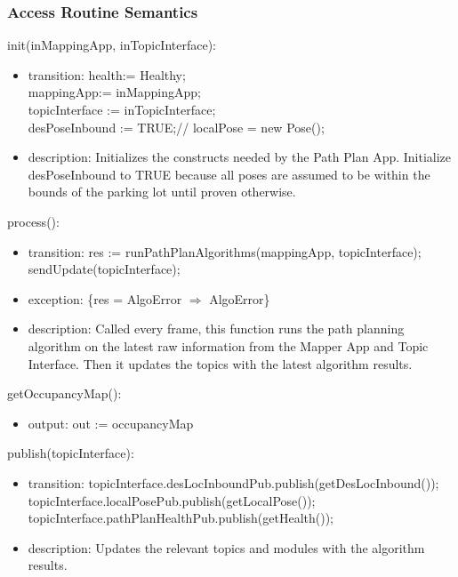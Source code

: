 \documentclass[12pt, titlepage]{article}
\begin{document}
\subsubsection{Access Routine Semantics}
\noindent init(inMappingApp, inTopicInterface):
\begin{itemize}
\item transition: health:= Healthy; \\ mappingApp:= inMappingApp; \\ topicInterface := inTopicInterface; \\ desPoseInbound := TRUE;//
localPose = new Pose(); 
\item description: Initializes the constructs needed by the Path Plan App. Initialize desPoseInbound to TRUE because all poses are assumed to be within the bounds of the parking lot until proven otherwise.
\end{itemize}
\noindent process():
\begin{itemize}
\item transition: res := runPathPlanAlgorithms(mappingApp, topicInterface); \\
sendUpdate(topicInterface);
\item exception: \{res = AlgoError $\Rightarrow$ AlgoError\}
\item description: Called every frame, this function runs the path planning algorithm on the latest raw information from the Mapper App and Topic Interface. Then it updates the topics with the latest algorithm results.
\end{itemize}
\noindent getOccupancyMap():
\begin{itemize}
\item output: out := occupancyMap
\end{itemize}
\noindent publish(topicInterface):
\begin{itemize}
\item transition: topicInterface.desLocInboundPub.publish(getDesLocInbound()); \\
topicInterface.localPosePub.publish(getLocalPose()); \\
topicInterface.pathPlanHealthPub.publish(getHealth()); \\
\item description: Updates the relevant topics and modules with the algorithm results.
\end{itemize}
\end{document}

